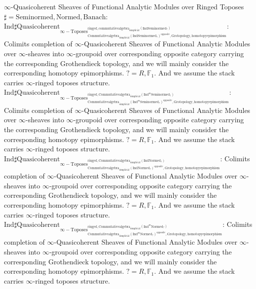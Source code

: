 \documentclass[11pt]{book}
\theoremstyle{definition}
\numberwithin{equation}{section}
\begin{document}
\noindent $\infty$-Quasicoherent Sheaves of Functional Analytic Modules over Ringed Toposes $\sharp=\mathrm{Seminormed},\mathrm{Normed},\mathrm{Banach}$: \\
 
 \noindent $\mathrm{Ind}\mathrm{\sharp Quasicoherent}_{\infty-\mathrm{Toposes}^{\mathrm{ringed},\mathrm{commutativealgebra}_{\mathrm{simplicial}}(\mathrm{Ind}\mathrm{Seminormed}_?)}_{\mathrm{Commutativealgebra}_{\mathrm{simplicial}}(\mathrm{Ind}\mathrm{Seminormed}_?)^\mathrm{opposite},\mathrm{Grotopology,homotopyepimorphism}}}$: Colimits completion of $\infty$-Quasicoherent Sheaves of Functional Analytic Modules over $\infty$-sheaves into $\infty$-groupoid over corresponding opposite category carrying the corresponding Grothendieck topology, and we will mainly consider the corresponding homotopy epimorphisms. $?=R,\mathbb{F}_1$. And we assume the stack carries $\infty$-ringed toposes structure. \\
\noindent $\mathrm{Ind}\mathrm{\sharp Quasicoherent}_{\infty-\mathrm{Toposes}^{\mathrm{ringed},\mathrm{Commutativealgebra}_{\mathrm{simplicial}}(\mathrm{Ind}^m\mathrm{Seminormed}_?)}_{\mathrm{Commutativealgebra}_{\mathrm{simplicial}}(\mathrm{Ind}^m\mathrm{Seminormed}_?)^\mathrm{opposite},\mathrm{Grotopology,homotopyepimorphism}}}$: Colimits completion of $\infty$-Quasicoherent Sheaves of Functional Analytic Modules over $\infty$-sheaves into $\infty$-groupoid over corresponding opposite category carrying the corresponding Grothendieck topology, and we will mainly consider the corresponding homotopy epimorphisms. $?=R,\mathbb{F}_1$. And we assume the stack carries $\infty$-ringed toposes structure.\\
\noindent $\mathrm{Ind}\mathrm{\sharp Quasicoherent}_{\infty-\mathrm{Toposes}^{\mathrm{ringed},\mathrm{Commutativealgebra}_{\mathrm{simplicial}}(\mathrm{Ind}\mathrm{Normed}_?)}_{\mathrm{Commutativealgebra}_{\mathrm{simplicial}}(\mathrm{Ind}\mathrm{Normed}_?)^\mathrm{opposite},\mathrm{Grotopology,homotopyepimorphism}}}$: Colimits completion of $\infty$-Quasicoherent Sheaves of Functional Analytic Modules over $\infty$-sheaves into $\infty$-groupoid over corresponding opposite category carrying the corresponding Grothendieck topology, and we will mainly consider the corresponding homotopy epimorphisms. $?=R,\mathbb{F}_1$. And we assume the stack carries $\infty$-ringed toposes structure.\\
\noindent $\mathrm{Ind}\mathrm{\sharp Quasicoherent}_{\infty-\mathrm{Toposes}^{\mathrm{ringed},\mathrm{Commutativealgebra}_{\mathrm{simplicial}}(\mathrm{Ind}^m\mathrm{Normed}_?)}_{\mathrm{Commutativealgebra}_{\mathrm{simplicial}}(\mathrm{Ind}^m\mathrm{Normed}_?)^\mathrm{opposite},\mathrm{Grotopology,homotopyepimorphism}}}$: Colimits completion of $\infty$-Quasicoherent Sheaves of Functional Analytic Modules over $\infty$-sheaves into $\infty$-groupoid over corresponding opposite category carrying the corresponding Grothendieck topology, and we will mainly consider the corresponding homotopy epimorphisms. $?=R,\mathbb{F}_1$. And we assume the stack carries $\infty$-ringed toposes structure.\\
\end{document}
